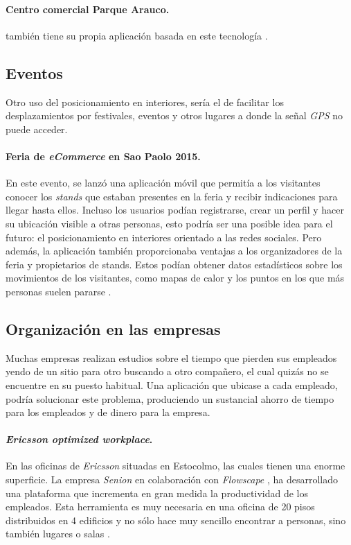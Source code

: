 \paragraph{Centro comercial Parque Arauco.} también tiene su propia aplicación basada en este tecnología \cite{noauthor_parque_nodate}.

\subsection{Eventos}
Otro uso del posicionamiento en interiores, sería el de facilitar los desplazamientos por festivales, eventos y otros lugares a donde la señal \textit{GPS} no puede acceder.

\paragraph{Feria de \textit{eCommerce} en Sao Paolo 2015.} En este evento, se lanzó una aplicación móvil que permitía a los visitantes conocer los \textit{stands} que estaban presentes en la feria y recibir indicaciones para llegar hasta ellos. Incluso los usuarios podían registrarse, crear un perfil y hacer su ubicación visible a otras personas, esto podría ser una posible idea para el futuro: el posicionamiento en interiores orientado a las redes sociales. Pero además, la aplicación también proporcionaba ventajas a los organizadores de la feria y propietarios de stands. Estos podían obtener datos estadísticos sobre los movimientos de los visitantes, como mapas de calor y los puntos en los que más personas suelen pararse \cite{noauthor_feria_2015}.

\subsection{Organización en las empresas}
Muchas empresas realizan estudios sobre el tiempo que pierden sus empleados yendo de un sitio para otro buscando a otro compañero, el cual quizás no se encuentre en su puesto habitual. Una aplicación que ubicase a cada empleado, podría solucionar este problema, produciendo un sustancial ahorro de tiempo para los empleados y de dinero para la empresa.

\paragraph{\textit{Ericsson optimized workplace}.} En las oficinas de \textit{Ericsson} situadas en Estocolmo, las cuales tienen una enorme superficie. La empresa \textit{Senion} en colaboración con \textit{Flowscape} \cite{noauthor_flowscape_nodate}, ha desarrollado una plataforma que incrementa en gran medida la productividad de los empleados. Esta herramienta es muy necesaria en una oficina de 20 pisos distribuidos en 4 edificios y no sólo hace muy sencillo encontrar a personas, sino también lugares o salas \cite{noauthor_ericsson_nodate}.

